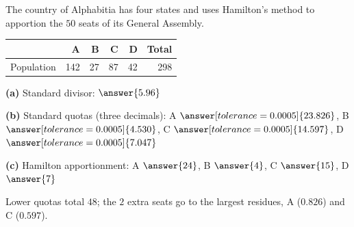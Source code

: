 \documentclass[12pt]{ximera}
\begin{document}
\begin{problem}
The country of Alphabitia has four states and uses Hamilton's method to apportion the
$50$ seats of its General Assembly.
\begin{center}
\begin{tabular}{r|rrrrr}
 & A & B & C & D & Total\\\hline
Population & 142 & 27 & 87 & 42 & 298
\end{tabular}
\end{center}

\begin{prompt}
\textbf{(a)} Standard divisor: $\answer{5.96}$
\end{prompt}

\begin{prompt}
\textbf{(b)} Standard quotas (three decimals): A $\answer[tolerance=0.0005]{23.826}$,
B $\answer[tolerance=0.0005]{4.530}$, C $\answer[tolerance=0.0005]{14.597}$,
D $\answer[tolerance=0.0005]{7.047}$
\end{prompt}

\begin{prompt}
\textbf{(c)} Hamilton apportionment: A $\answer{24}$, B $\answer{4}$, C $\answer{15}$,
D $\answer{7}$
\begin{feedback}
Lower quotas total $48$; the $2$ extra seats go to the largest residues, A ($0.826$) and
C ($0.597$).
\end{feedback}
\end{prompt}
\end{problem}
\end{document}

